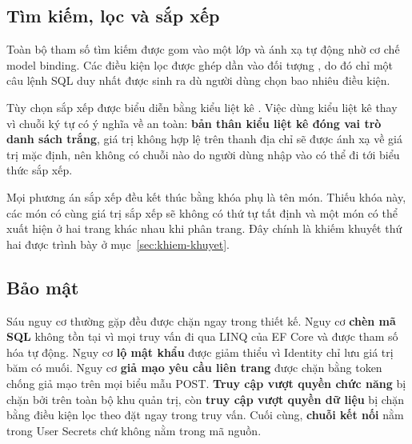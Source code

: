 \subsection{Tìm kiếm, lọc và sắp xếp}

Toàn bộ tham số tìm kiếm được gom vào một lớp  và ánh
xạ tự động nhờ cơ chế model binding. Các điều kiện lọc được ghép dần vào đối
tượng , do đó chỉ một câu lệnh SQL duy nhất được sinh ra dù
người dùng chọn bao nhiêu điều kiện.

Tùy chọn sắp xếp được biểu diễn bằng kiểu liệt kê . Việc
dùng kiểu liệt kê thay vì chuỗi ký tự có ý nghĩa về an toàn: \textbf{bản thân
kiểu liệt kê đóng vai trò danh sách trắng}, giá trị không hợp lệ trên thanh địa
chỉ sẽ được ánh xạ về giá trị mặc định, nên không có chuỗi nào do người dùng nhập
vào có thể đi tới biểu thức sắp xếp.

Mọi phương án sắp xếp đều kết thúc bằng khóa phụ là tên món. Thiếu khóa này, các
món có cùng giá trị sắp xếp sẽ không có thứ tự tất định và một món có thể xuất
hiện ở hai trang khác nhau khi phân trang. Đây chính là khiếm khuyết thứ hai được
trình bày ở mục~\ref{sec:khiem-khuyet}.

\subsection{Bảo mật}

Sáu nguy cơ thường gặp đều được chặn ngay trong thiết kế. Nguy cơ \textbf{chèn mã
SQL} không tồn tại vì mọi truy vấn đi qua LINQ của EF Core và được tham số hóa tự
động. Nguy cơ \textbf{lộ mật khẩu} được giảm thiểu vì Identity chỉ lưu giá trị
băm có muối. Nguy cơ \textbf{giả mạo yêu cầu liên trang} được chặn bằng token
chống giả mạo trên mọi biểu mẫu POST. \textbf{Truy cập vượt quyền chức năng} bị
chặn bởi \code{[Authorize(Roles = "Admin")]} trên toàn bộ khu quản trị, còn
\textbf{truy cập vượt quyền dữ liệu} bị chặn bằng điều kiện lọc theo
 đặt ngay trong truy vấn. Cuối cùng, \textbf{chuỗi kết nối} nằm
trong User Secrets chứ không nằm trong mã nguồn.
